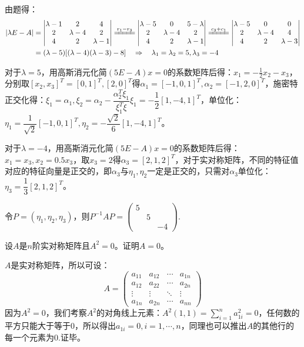 \documentclass[a4paper]{report}
\begin{document}
\begin{jie}
由题得：
\begin{align*}
|\lambda E-A|&=
\begin{vmatrix}
\lambda-1&2&4\\
2&\lambda-4&2\\
4&2&\lambda-1
\end{vmatrix}\xlongequal{r_1-r_3}
\begin{vmatrix}
\lambda-5&0&5-\lambda\\
2&\lambda-4&2\\
4&2&\lambda-1
\end{vmatrix}\xlongequal{c_3+c_1}
\begin{vmatrix}
\lambda-5&0&0\\
2&\lambda-4&4\\
4&2&\lambda-3
\end{vmatrix}\\&=(\lambda-5)[(\lambda-4)(\lambda-3)-8]~~~\Rightarrow~~~\lambda_{1}=\lambda_{2}=5,\lambda_3=-4
\end{align*}

对于$\lambda=5$，用高斯消元化简$(5E-A)x=0$的系数矩阵后得：$x_1=-\frac{1}{2}x_2-x_3$，分别取$[x_2,x_3]^T=[0,1]^T,[2,0]^T$得$\alpha_1=[-1,0,1]^T,\alpha_2=[-1,2,0]^T$，施密特正交化得：$\xi_1=\alpha_1,\xi_2=\alpha_2
-\dfrac{\alpha_2^T\xi_1}{\xi_1^T\xi}\xi_1=-\dfrac{1}{2}[1,-4,1]^T
$，单位化：$\eta_1=\dfrac{1}{\sqrt{2}}[-1,0,1]^T,\eta_{2}=-\dfrac{\sqrt{2}}{6}[1,-4,1]^T$。

对于$\lambda=-4$，用高斯消元化简$(5E-A)x=0$的系数矩阵后得：$x_1=x_3,x_2=0.5x_3$，取$x_3=2$得$\alpha_3=[2,1,2]^T$，对于实对称矩阵，不同的特征值对应的特征向量是正交的，即$\alpha_3$与$\eta_1,\eta_2$一定是正交的，只需对$\alpha_3$单位化：$\eta_3=\dfrac{1}{3}[2,1,2]^T$。

令$P=
(\eta_1,\eta_2,\eta_3)
$，则$P^{-1}AP=
\begin{pmatrix}
5\\&5\\&&-4
\end{pmatrix}
$.
\end{jie}

\EX 设$A$是$n$阶实对称矩阵且$A^2=0$。证明$A=0$。

\begin{zhengming}
$A$是实对称矩阵，所以可设：
\begin{equation*}
A=
\begin{pmatrix}
a_{11}&a_{12}&\cdots&a_{1n}\\
a_{12}&a_{22}&\cdots&a_{2n}\\
\vdots&\vdots&\ddots&\vdots\\
a_{1n}&a_{2n}&\cdots&a_{nn}
\end{pmatrix}
\end{equation*}
因为$A^2=0$，我们考察$A^2$的对角线上元素：$A^2(1,1)=\sum\limits_{i=1}^{n}a_{1i}^2=0$，任何数的平方只能大于等于0，所以得出$a_{1i}=0,i=1,\cdots,n$，同理也可以推出$A$的其他行的每一个元素为0.证毕。
\end{zhengming}
\end{document}
